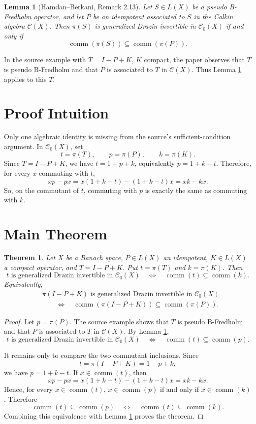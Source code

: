 \documentclass[11pt]{article}
\newtheorem{theorem}{Theorem}
\newtheorem{lemma}{Lemma}
\newcommand{\Calk}{\mathcal C}
\newcommand{\Czero}{\mathcal C_0}
\newcommand{\comm}{\operatorname{comm}}
\begin{document}
\begin{lemma}[Hamdan--Berkani, Remark 2.13]
\label{lem:source}
Let \(S\in L(X)\) be a pseudo B-Fredholm operator, and let \(P\) be an
idempotent associated to \(S\) in the Calkin algebra \(\Calk(X)\).  Then
\(\pi(S)\) is generalized Drazin invertible in \(\Czero(X)\) if and only if
\[
  \comm(\pi(S))\subseteq \comm(\pi(P)).
\]
\end{lemma}

In the source example with \(T=I-P+K\), \(K\) compact, the paper observes that
\(T\) is pseudo B-Fredholm and that \(P\) is associated to \(T\) in
\(\Calk(X)\).  Thus Lemma \ref{lem:source} applies to this \(T\).

\section*{Proof Intuition}

Only one algebraic identity is missing from the source's sufficient-condition
argument.  In \(\Czero(X)\), set
\[
  t=\pi(T), \qquad p=\pi(P), \qquad k=\pi(K).
\]
Since \(T=I-P+K\), we have \(t=1-p+k\), equivalently \(p=1+k-t\).  Therefore,
for every \(x\) commuting with \(t\),
\[
  xp-px = x(1+k-t)-(1+k-t)x = xk-kx.
\]
So, on the commutant of \(t\), commuting with \(p\) is exactly the same as
commuting with \(k\).

\section*{Main Theorem}

\begin{theorem}
\label{thm:main}
Let \(X\) be a Banach space, \(P\in L(X)\) an idempotent, \(K\in L(X)\) a
compact operator, and \(T=I-P+K\).  Put \(t=\pi(T)\) and \(k=\pi(K)\).  Then
\[
  t \text{ is generalized Drazin invertible in } \Czero(X)
  \quad\Longleftrightarrow\quad
  \comm(t)\subseteq \comm(k).
\]
Equivalently,
\[
  \begin{aligned}
  &\pi(I-P+K) \text{ is generalized Drazin invertible in } \Czero(X)\\
  &\qquad\Longleftrightarrow\quad
  \comm(\pi(I-P+K))\subseteq \comm(\pi(P)).
  \end{aligned}
\]
\end{theorem}

\begin{proof}
Let \(p=\pi(P)\).  The source example shows that \(T\) is pseudo B-Fredholm
and that \(P\) is associated to \(T\) in \(\Calk(X)\).  By Lemma
\ref{lem:source},
\[
  t \text{ is generalized Drazin invertible in } \Czero(X)
  \quad\Longleftrightarrow\quad
  \comm(t)\subseteq \comm(p).
\]

It remains only to compare the two commutant inclusions.  Since
\[
  t=\pi(I-P+K)=1-p+k,
\]
we have \(p=1+k-t\).  If \(x\in\comm(t)\), then
\[
  xp-px=x(1+k-t)-(1+k-t)x=xk-kx.
\]
Hence, for every \(x\in\comm(t)\), \(x\in\comm(p)\) if and only if
\(x\in\comm(k)\).  Therefore
\[
  \comm(t)\subseteq\comm(p)
  \quad\Longleftrightarrow\quad
  \comm(t)\subseteq\comm(k).
\]
Combining this equivalence with Lemma \ref{lem:source} proves the theorem.
\end{proof}
\end{document}
